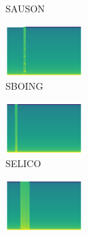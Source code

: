 \begin{figure}[H]
{\begin{subfigure}{0.23\textwidth}
{{        }\hspace*{0.75cm}%
      }%
      \caption*{SAUSON}
    \end{subfigure}
    \begin{subfigure}{0.23\textwidth}
      \includegraphics[width=3cm]{tempest_sounds/buttons/SBOING.raw-button.png}%
      \caption*{SBOING}
    \end{subfigure}
    \begin{subfigure}{0.23\textwidth}
      \includegraphics[width=3cm]{tempest_sounds/buttons/SELICO.raw-button.png}%
      \caption*{SELICO}
    \end{subfigure}
    \begin{subfigure}{0.245\textwidth}
      \includegraphics[width=3cm]{tempest_sounds/buttons/SLAUNC.raw-button.png}%
\end{subfigure}}
\end{figure}
